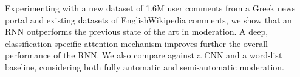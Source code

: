 Experimenting with a new dataset of 1.6M user comments from a Greek news portal and existing datasets of EnglishWikipedia comments, we show that an RNN outperforms the previous state of the art in moderation. A deep, classification-specific attention mechanism improves further the overall performance of the RNN. We also compare against a CNN and a word-list baseline, considering both fully automatic and semi-automatic moderation.
